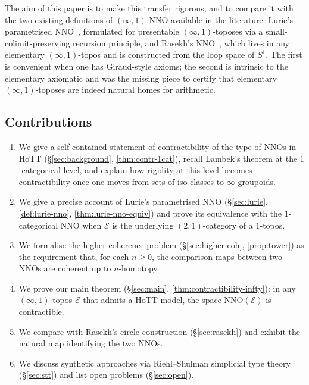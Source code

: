 \documentclass[12pt]{article}
\theoremstyle{definition}
\theoremstyle{remark}
\newcommand{\Sone}{S^{1}}
\begin{document}
The aim of this paper is to make this transfer rigorous, and to compare it with the two existing definitions of $(\infty,1)$-NNO available in the literature: Lurie's parametrised NNO~\cite{LurieHTT, LurieSAG}, formulated for presentable $(\infty,1)$-toposes via a small-colimit-preserving recursion principle, and Rasekh's NNO~\cite{Rasekh2021}, which lives in any elementary $(\infty,1)$-topos and is constructed from the loop space of $\Sone$. The first is convenient when one has Giraud-style axioms; the second is intrinsic to the elementary axiomatic and was the missing piece to certify that elementary $(\infty,1)$-toposes are indeed natural homes for arithmetic.

\subsection*{Contributions}

\begin{enumerate}
  \item We give a self-contained statement of contractibility of the type of NNOs in HoTT (\S\ref{sec:background}, \cref{thm:contr-1cat}), recall Lambek's theorem at the $1$-categorical level, and explain how rigidity at this level becomes contractibility once one moves from sets-of-iso-classes to $\infty$-groupoids.
  \item We give a precise account of Lurie's parametrised NNO (\S\ref{sec:lurie}, \cref{def:lurie-nno}, \cref{thm:lurie-nno-equiv}) and prove its equivalence with the $1$-categorical NNO when $\mathcal{E}$ is the underlying $(2,1)$-category of a $1$-topos.
  \item We formalise the higher coherence problem (\S\ref{sec:higher-coh}, \cref{prop:tower}) as the requirement that, for each $n\geq 0$, the comparison maps between two NNOs are coherent up to $n$-homotopy.
  \item We prove our main theorem (\S\ref{sec:main}, \cref{thm:contractibility-infty}): in any $(\infty,1)$-topos $\mathcal{E}$ that admits a HoTT model, the space $\mathrm{NNO}(\mathcal{E})$ is contractible.
  \item We compare with Rasekh's circle-construction (\S\ref{sec:rasekh}) and exhibit the natural map identifying the two NNOs.
  \item We discuss synthetic approaches via Riehl--Shulman simplicial type theory (\S\ref{sec:stt}) and list open problems (\S\ref{sec:open}).
\end{enumerate}
\end{document}

